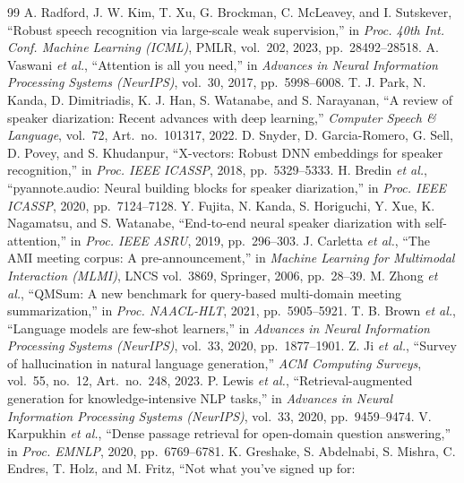 \documentclass[conference]{IEEEtran}
\begin{document}
\begin{thebibliography}{99}
 A. Radford, J. W. Kim, T. Xu, G. Brockman, C. McLeavey, and I. Sutskever, ``Robust speech
recognition via large-scale weak supervision,'' in \emph{Proc. 40th Int. Conf. Machine Learning (ICML)}, PMLR, vol.~202,
2023, pp.~28492--28518.
 A. Vaswani \emph{et al.}, ``Attention is all you need,'' in \emph{Advances in Neural Information
Processing Systems (NeurIPS)}, vol.~30, 2017, pp.~5998--6008.
 T. J. Park, N. Kanda, D. Dimitriadis, K. J. Han, S. Watanabe, and S. Narayanan, ``A review of speaker
diarization: Recent advances with deep learning,'' \emph{Computer Speech \& Language}, vol.~72, Art.~no.~101317, 2022.
 D. Snyder, D. Garcia-Romero, G. Sell, D. Povey, and S. Khudanpur, ``X-vectors: Robust DNN
embeddings for speaker recognition,'' in \emph{Proc. IEEE ICASSP}, 2018, pp.~5329--5333.
 H. Bredin \emph{et al.}, ``pyannote.audio: Neural building blocks for speaker diarization,'' in
\emph{Proc. IEEE ICASSP}, 2020, pp.~7124--7128.
 Y. Fujita, N. Kanda, S. Horiguchi, Y. Xue, K. Nagamatsu, and S. Watanabe, ``End-to-end neural speaker
diarization with self-attention,'' in \emph{Proc. IEEE ASRU}, 2019, pp.~296--303.
 J. Carletta \emph{et al.}, ``The AMI meeting corpus: A pre-announcement,'' in \emph{Machine Learning
for Multimodal Interaction (MLMI)}, LNCS vol.~3869, Springer, 2006, pp.~28--39.
 M. Zhong \emph{et al.}, ``QMSum: A new benchmark for query-based multi-domain meeting summarization,''
in \emph{Proc. NAACL-HLT}, 2021, pp.~5905--5921.
 T. B. Brown \emph{et al.}, ``Language models are few-shot learners,'' in \emph{Advances in Neural
Information Processing Systems (NeurIPS)}, vol.~33, 2020, pp.~1877--1901.
 Z. Ji \emph{et al.}, ``Survey of hallucination in natural language generation,'' \emph{ACM
Computing Surveys}, vol.~55, no.~12, Art.~no.~248, 2023.
 P. Lewis \emph{et al.}, ``Retrieval-augmented generation for knowledge-intensive NLP tasks,'' in
\emph{Advances in Neural Information Processing Systems (NeurIPS)}, vol.~33, 2020, pp.~9459--9474.
 V. Karpukhin \emph{et al.}, ``Dense passage retrieval for open-domain question answering,'' in
\emph{Proc. EMNLP}, 2020, pp.~6769--6781.
 K. Greshake, S. Abdelnabi, S. Mishra, C. Endres, T. Holz, and M. Fritz, ``Not what you've signed up for:

\end{thebibliography}
\end{document}
